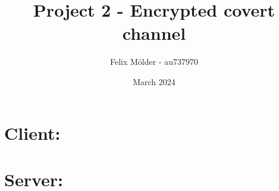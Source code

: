 \documentclass{article}
\title{Project 2 - Encrypted covert channel}
\author{Felix Mölder - au737970}
\date{March 2024}
\begin{document}
\maketitle

\section*{Client:}

\section*{Server:}
\end{document}
